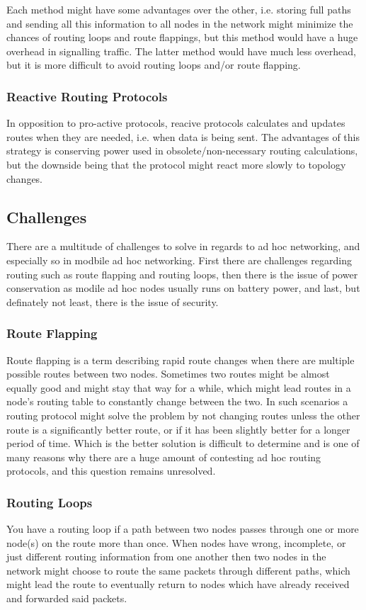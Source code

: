 Each method might have some advantages over the other, i.e. storing full paths
and sending all this information to all nodes in the network might minimize the
chances of routing loops and route flappings, but this method would have a huge
overhead in signalling traffic. The latter method would have much less overhead,
but it is more difficult to avoid routing loops and/or route flapping.

\subsubsection*{Reactive Routing Protocols}
In opposition to pro-active protocols, reacive protocols calculates and updates
routes when they are needed, i.e. when data is being sent. The advantages of
this strategy is conserving power used in obsolete/non-necessary routing
calculations, but the downside being that the protocol might react more slowly
to topology changes.

\subsection{Challenges}
There are a multitude of challenges to solve in regards to ad hoc networking,
and especially so in modbile ad hoc networking. First there are challenges
regarding routing such as route flapping and routing loops, then there is the
issue of power conservation as modile ad hoc nodes usually runs on battery
power, and last, but definately not least, there is the issue of security.

\subsubsection*{Route Flapping}
Route flapping is a term describing rapid route changes when there are multiple
possible routes between two nodes. Sometimes two routes might be almost equally
good and might stay that way for a while, which might lead routes in a node's
routing table to constantly change between the two. In such scenarios a routing
protocol might solve the problem by not changing routes unless the other route
is a significantly better route, or if it has been slightly better for a longer
period of time. Which is the better solution is difficult to determine and is
one of many reasons why there are a huge amount of contesting ad hoc routing
protocols, and this question remains unresolved.

\subsubsection*{Routing Loops}
You have a routing loop if a path between two nodes passes through one or more
node(s) on the route more than once. When nodes have wrong, incomplete, or just
different routing information from one another then two nodes in the network
might choose to route the same packets through different paths, which might
lead the route to eventually return to nodes which have already received and
forwarded said packets.

